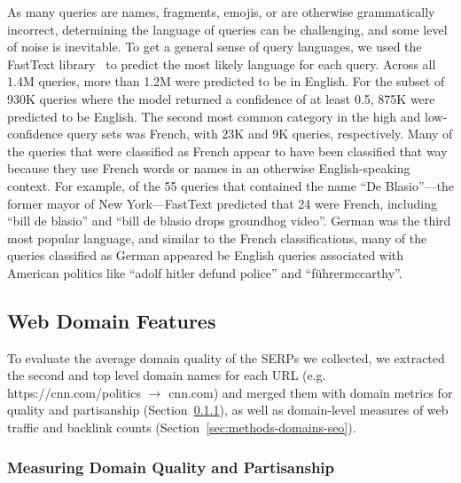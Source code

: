 As many queries are names, fragments, emojis, or are otherwise grammatically incorrect, determining the language of queries can be challenging, and some level of noise is inevitable. To get a general sense of query languages, we used the FastText library~\citep{joulin2016bag} to predict the most likely language for each query. Across all 1.4M queries, more than 1.2M were predicted to be in English. For the subset of 930K queries where the model returned a confidence of at least 0.5, 875K were predicted to be English. The second most common category in the high and low-confidence query sets was French, with 23K and 9K queries, respectively. Many of the queries that were classified as French appear to have been classified that way because they use French words or names in an otherwise English-speaking context. For example, of the 55 queries that contained the name ``De Blasio''---the former mayor of New York---FastText predicted that 24 were French, including  ``bill de blasio'' and ``bill de blasio drops groundhog video''. 
German was the third most popular language, and similar to the French classifications, many of the queries classified as German appeared be English queries associated with American politics like ``adolf hitler defund police'' and ``f\"{u}hrermccarthy''.

\subsection{Web Domain Features}
\label{sec:methods-domains}

To evaluate the average domain quality of the SERPs we collected, we extracted the second and top level domain names for each URL (e.g. https://cnn.com/politics $\rightarrow$ cnn.com) and merged them with domain metrics for quality and partisanship (Section~\ref{sec:methods-domains-quality}), as well as domain-level measures of web traffic and backlink counts (Section~\ref{sec:methods-domains-seo}).

\subsubsection{Measuring Domain Quality and Partisanship}
\label{sec:methods-domains-quality}

